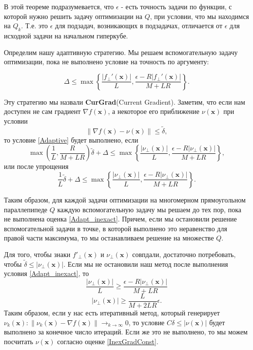 \documentclass[12pt]{article}
\begin{document}
В этой теореме подразумевается, что $\epsilon$ - есть точность задачи по функции, с которой нужно решить задачу оптимизации на $Q$, при условии, что мы находимся на $Q_k$. Т.е. это $\epsilon$ для подзадач, возникающих в подзадачах, отличается от $\epsilon$ для исходной задачи на начальном гиперкубе.

Определим нашу адаптивную стратегию. Мы решаем вспомогательную задачу оптимизации, пока не выполнено условие на точность по аргументу:

\begin{equation}
\label{Adaptive}
\Delta \leq \max\left\{
	\frac{|f_\perp'(\textbf{x})|}{L}, 
	\frac{\epsilon - R |f_\perp'(\textbf{x})|}{M+LR}
	\right\}.
\end{equation}

Эту стратегию мы назвали \textbf{CurGrad}(Current Gradient). Заметим, что если нам доступен не сам градиент $\nabla f(\textbf{x})$, а некоторое его приближение $\nu(\textbf{x})$ при условии
$$\|\nabla f(\textbf{x}) - \nu(\textbf{x})\|\leq \tilde{\delta},$$
то условие \ref{Adaptive} будет выполнено, если 
$$
\max\left(\frac{1}{L}, \frac{R}{M+LR}\right) \tilde{\delta} + \Delta \leq \max\left\{
	\frac{|\nu_\perp(\textbf{x})|}{L}, 
	\frac{\epsilon - R |\nu_\perp(\textbf{x})|}{M+LR}
	\right\},
$$
или после упрощения
\begin{equation}
\label{Adapt_inexact}
\frac{1}{L}\tilde{\delta} + \Delta \leq \max\left\{
	\frac{|\nu_\perp(\textbf{x})|}{L}, 
	\frac{\epsilon - R |\nu_\perp(\textbf{x})|}{M+LR}
	\right\}.
\end{equation}

Таким образом, для каждой задачи оптимизации на многомерном прямоугольном параллепипеде $Q$ каждую вспомогательную задачу мы решаем до тех пор, пока не выполнена оценка \ref{Adapt_inexact}. Причем, если мы остановили решение вспомогательной задачи в точке, в которой выполнено это неравенство для правой части максимума, то мы останавливаем решение на множестве $Q$.

Для того, чтобы знаки $f'_\perp(\textbf{x})$ и $\nu_\perp(\textbf{x})$ совпдали, достаточно потребовать, чтобы $\tilde{\delta} \leq |\nu_\perp(\textbf{x})|$. Если мы не остановили наш метод после выполнения условия \ref{Adapt_inexact}, то 
$$	\frac{|\nu_\perp(\textbf{x})|}{L} \geq
	\frac{\epsilon - R |\nu_\perp(\textbf{x})|}{M+LR}$$
$$|\nu_\perp(\textbf{x})| \geq \frac{L}{M+2LR}\epsilon.$$
Таким образом, если у нас есть итеративный метод, который генерирует $\nu_k(\textbf{x}):\|\nu_k(\textbf{x})- \nabla f(\textbf{x})\| \rightarrow_{k\rightarrow\infty}0$, то условие $C\delta \leq |\nu(\textbf{x})|$ будет выполнено за конечное число итераций. Если же это не выполнено, то мы можем посчитать $\nu(\textbf{x})$ согласно оценке \ref{InexGradConst}.
\end{document}
